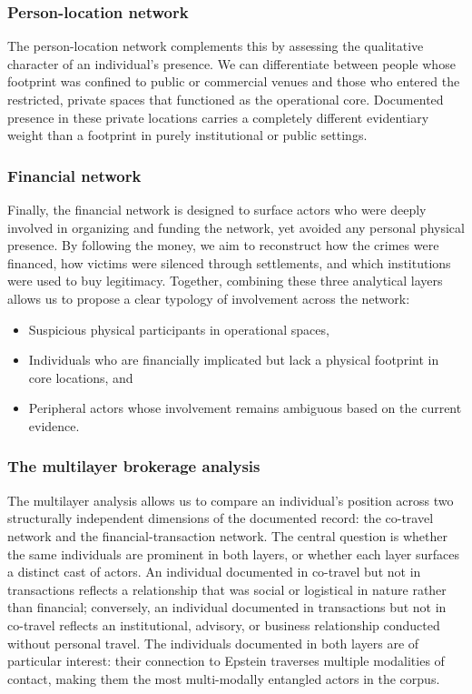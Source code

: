 \subsubsection{Person-location network}
The person-location network complements this by assessing the qualitative character of an individual's presence. We can differentiate between people whose footprint was confined to public or commercial venues and those who entered the restricted, private spaces that functioned as the operational core. Documented presence in these private locations carries a completely different evidentiary weight than a footprint in purely institutional or public settings.
\subsubsection{Financial network}
Finally, the financial network is designed to surface actors who were deeply involved in organizing and funding the network, yet avoided any personal physical presence. By following the money, we aim to reconstruct how the crimes were financed, how victims were silenced through settlements, and which institutions were used to buy legitimacy. Together, combining these three analytical layers allows us to propose a clear typology of involvement across the network:
\begin{itemize}
    \item Suspicious physical participants in operational spaces,
    \item Individuals who are financially implicated but lack a physical footprint in core locations, and
    \item Peripheral actors whose involvement remains ambiguous based on the current evidence.
\end{itemize}
\subsubsection{The multilayer brokerage analysis}
The multilayer analysis allows us to compare an individual's position across two structurally independent dimensions of the documented record: the co-travel network and the financial-transaction network. The central question is whether the same individuals are prominent in both layers, or whether each layer surfaces a distinct cast of actors. An individual documented in co-travel but not in transactions reflects a relationship that was social or logistical in nature rather than financial; conversely, an individual documented in transactions but not in co-travel reflects an institutional, advisory, or business relationship conducted without personal travel. The individuals documented in both layers are of particular interest: their connection to Epstein traverses multiple modalities of contact, making them the most multi-modally entangled actors in the corpus.
